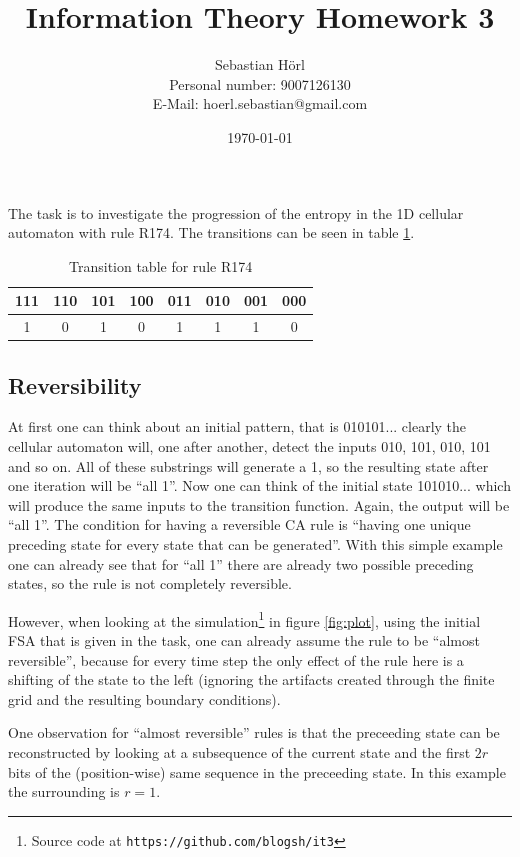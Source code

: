 \documentclass[12pt]{scrartcl}
\title{Information Theory Homework 3}
\author{Sebastian Hörl\\Personal number: 9007126130\\E-Mail: hoerl.sebastian@gmail.com}
\date{\today}
\begin{document}
\maketitle

The task is to investigate the progression of the entropy in the 1D cellular automaton with rule R174. The transitions can be seen in table \ref{tab:1}.

\begin{table}
\centering
\begin{tabular}{c|c|c|c|c|c|c|c}
111 & 110 & 101 & 100 & 011 & 010 & 001 & 000\\ \hline
1 & 0 & 1 & 0 & 1 & 1 & 1 & 0
\end{tabular}
\caption{Transition table for rule R174}
\label{tab:1}
\end{table}

\subsection*{Reversibility}

At first one can think about an initial pattern, that is 010101... clearly the cellular automaton will, one after another, detect the inputs 010, 101, 010, 101 and so on. All of these substrings will generate a 1, so the resulting state after one iteration will be ``all 1''. Now one can think of the initial state 101010... which will produce the same inputs to the transition function. Again, the output will be ``all 1''. 
The condition for having a reversible CA rule is ``having one unique preceding state for every state that can be generated''. With this simple example one can already see that for ``all 1'' there are already two possible preceding states, so the rule is not completely reversible.

However, when looking at the simulation\footnote{Source code at \texttt{https://github.com/blogsh/it3}} in figure \ref{fig:plot}, using the initial FSA that is given in the task, one can already assume the rule to be ``almost reversible'', because for every time step the only effect of the rule here is a shifting of the state to the left (ignoring the artifacts created through the finite grid and the resulting boundary conditions).

One observation for ``almost reversible'' rules is that the preceeding state can be reconstructed by looking at a subsequence of the current state and the first $2r$ bits of the (position-wise) same sequence in the preceeding state. In this example the surrounding is $r=1$. 
\end{document}
